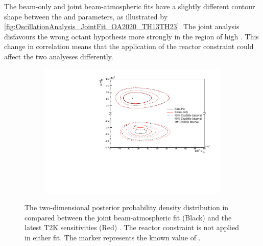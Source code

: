 The beam-only and joint beam-atmospheric fits have a slightly different contour shape between the  and  parameters, as illustrated by \autoref{fig:OscillationAnalysis_JointFit_OA2020_TH13TH23}. The joint analysis disfavours the wrong octant hypothesis more strongly in the region of high . This change in correlation means that the application of the reactor constraint could affect the two analyeses differently.

\begin{figure}[h]
  \begin{subfigure}[t]{0.98\textwidth}
    \includegraphics[width=\textwidth, trim={0mm 0mm 0mm 0mm}, clip,page=1]{Figures/OA/JointFit_OA2020_Comp/ContourComparison_2D_th13_dm32_BH_0_woRC_UnSmeared_CredibleInterval.pdf}
  \end{subfigure}
  \caption{The two-dimensional posterior probability density distribution in  compared between the joint beam-atmospheric fit (Black) and the latest T2K sensitivities (Red) \cite{Dunne2020-uf, t2k_tn_393}. The reactor constraint is not applied in either fit. The marker represents the known value of .}
  \label{fig:OscillationAnalysis_JointFit_OA2020_DM32TH13}
\end{figure}


